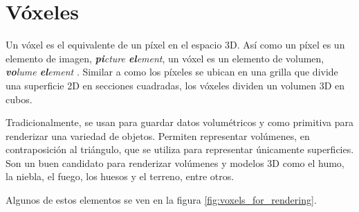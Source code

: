 \section{Vóxeles}

Un vóxel es el equivalente de un píxel en el espacio 3D.
Así como un píxel es un elemento de imagen, \textit{\textbf{pi}cture \textbf{el}ement}, un vóxel es un elemento de volumen, \textit{\textbf{vo}lume \textbf{el}ement} \cite{rtr}.
Similar a como los píxeles se ubican en una grilla que divide una superficie 2D en secciones cuadradas, los vóxeles dividen un volumen 3D en cubos.

Tradicionalmente, se usan para guardar datos volumétricos y como primitiva para renderizar una variedad de objetos.
Permiten representar volúmenes, en contraposición al triángulo, que se utiliza para representar únicamente superficies.
Son un buen candidato para renderizar volúmenes y modelos 3D como el humo, la niebla, el fuego, los huesos y el terreno, entre otros.

Algunos de estos elementos se ven en la figura \ref{fig:voxels_for_rendering}. %

